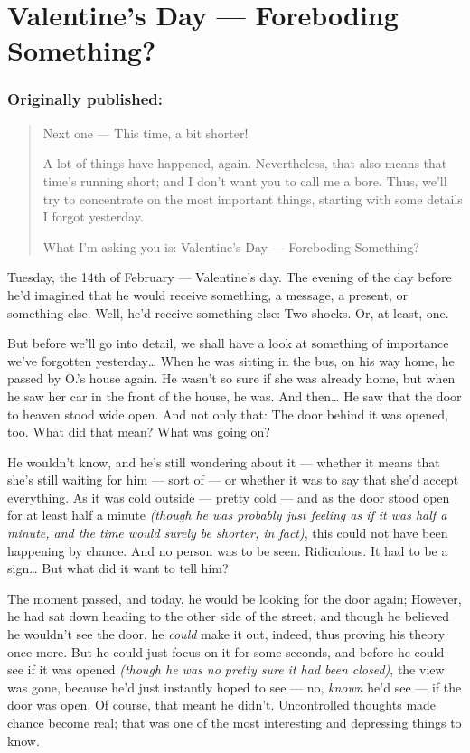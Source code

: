 \chapter{Valentine's Day --- Foreboding Something?}
\label{cha:valent-day-foreb}
\subsection*{Originally published: }
\begin{quote}
Next one --- This time, a bit shorter!

A lot of things have happened, again. 
Nevertheless, that also means that time's running short; and I don't want you to call me a bore. 
Thus, we'll try to concentrate on the most important things, starting with some details I forgot yesterday.

What I'm asking you is: Valentine's Day --- Foreboding Something?
\end{quote}

Tuesday, the 14th of February --- Valentine's day. 
The evening of the day before he'd imagined that he would receive something, a message, a present, or something else. 
Well, he'd receive something else: Two shocks. 
Or, at least, one.

But before we'll go into detail, we shall have a look at something of importance we've forgotten yesterday\ldots
When he was sitting in the bus, on his way home, he passed by O.'s house again. He wasn't so sure if she was already home, but when he saw her car in the front of the house, he was. And then\ldots
He saw that the door to heaven stood wide open. 
And not only that: The door behind it was opened, too. What did that mean?
What was going on?

He wouldn't know, and he's still wondering about it --- whether it means that she's still waiting for him --- sort of --- or whether it was to say that she'd accept everything. 
As it was cold outside --- pretty cold --- and as the door stood open for at least half a minute \emph{(though he was probably just feeling as if it was half a minute, and the time would surely be shorter, in fact)}, this could not have been happening by chance. And no person was to be seen. Ridiculous. It had to be a sign\ldots
But what did it want to tell him?

The moment passed, and today, he would be looking for the door again; However, he had sat down heading to the other side of the street, and though he believed he wouldn't see the door, he \emph{could} make it out, indeed, thus proving his theory once more. But he could just focus on it for some seconds, and before he could see if it was opened \emph{(though he was no pretty sure it had been closed)}, the view was gone, because he'd just instantly hoped to see --- no, \emph{known} he'd see --- if the door was open. Of course, that meant he didn't. 
Uncontrolled thoughts made chance become real; that was one of the most interesting and depressing things to know.

